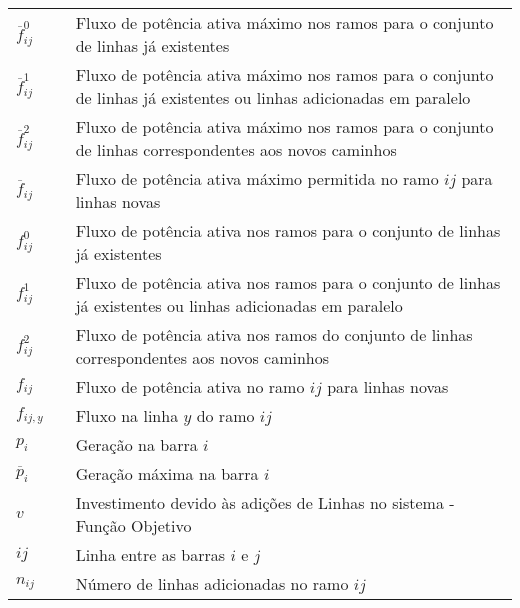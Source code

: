 \begin{tabular}{l c p{.85\linewidth}}
$\overline{f}_{ij}^0$  & & Fluxo de potência ativa máximo nos ramos para o conjunto de linhas já existentes\\

$\overline{f}_{ij}^1$  & & Fluxo de potência ativa máximo nos ramos para o conjunto de linhas já existentes ou linhas adicionadas em paralelo\\ 

$\overline{f}_{ij}^2$  & & Fluxo de potência ativa máximo nos ramos para o conjunto de linhas correspondentes aos novos caminhos\\ 

$\overline{f}_{ij}$    & & Fluxo de potência ativa máximo permitida no ramo $ij$ para linhas novas\\

$f_{ij}^0$             & & Fluxo de potência ativa nos ramos para o conjunto de linhas já existentes\\

$f_{ij}^1$             & & Fluxo de potência ativa nos ramos para o conjunto de linhas já existentes ou linhas adicionadas em paralelo\\

$f_{ij}^2$             & & Fluxo de potência ativa nos ramos do conjunto de linhas correspondentes aos novos caminhos\\

$f_{ij}$               & & Fluxo de potência ativa no ramo $ij$ para linhas novas\\

$f_{ij,y}$             & & Fluxo na linha $y$ do ramo $ij$\\

$p_{i}$                & & Geração na barra $i$\\

$\overline{p}_{i}$     & & Geração máxima na barra $i$\\

$v$                    & & Investimento devido às adições de Linhas no sistema - Função Objetivo\\

$ij$                   & & Linha entre as barras $i$ e $j$ \\

$n_{ij}$               & & Número de linhas adicionadas no ramo $ij$


\end{tabular}

